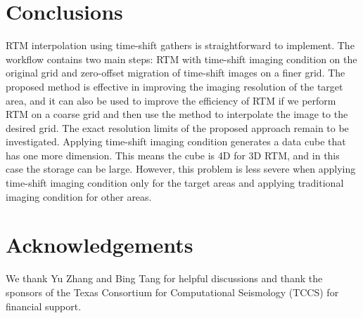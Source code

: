\section{Conclusions}
RTM interpolation using time-shift gathers is straightforward to implement. 
The workflow contains two main steps: RTM with time-shift imaging condition
on the original grid and zero-offset migration of time-shift images on a finer grid.
The proposed method is effective in improving the imaging resolution of the target area, and 
it can also be used to improve the efficiency of RTM if we perform RTM on a coarse grid and then use
the method to interpolate the image to the desired grid.
The exact resolution limits of the proposed approach remain to be investigated.
Applying time-shift imaging condition generates a data cube that has one more dimension.
This means the cube is 4D for 3D RTM, and in this case the storage can be large.
However, this problem is less severe when applying time-shift imaging condition only for the target areas and 
applying traditional imaging condition for other areas.

\section{Acknowledgements}
We thank Yu Zhang and Bing Tang for helpful discussions and 
thank the sponsors of the Texas Consortium for Computational Seismology (TCCS) for financial support.

\onecolumn


